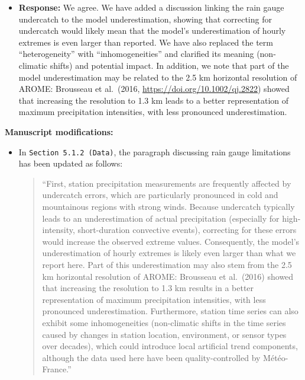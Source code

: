 \documentclass[
  letterpaper,
  DIV=11,
  numbers=noendperiod]{scrartcl}
\providecommand{\tightlist}{%
  \setlength{\itemsep}{0pt}\setlength{\parskip}{0pt}}\usepackage{longtable,booktabs,array}
\begin{document}
\begin{itemize}
\tightlist
\item
  \textbf{Response:} We agree. We have added a discussion linking the
  rain gauge undercatch to the model underestimation, showing that
  correcting for undercatch would likely mean that the model's
  underestimation of hourly extremes is even larger than reported. We
  have also replaced the term ``heterogeneity'' with ``inhomogeneities''
  and clarified its meaning (non-climatic shifts) and potential impact.
  In addition, we note that part of the model underestimation may be
  related to the 2.5 km horizontal resolution of AROME: Brousseau et
  al.~(2016, \url{https://doi.org/10.1002/qj.2822}) showed that
  increasing the resolution to 1.3 km leads to a better representation
  of maximum precipitation intensities, with less pronounced
  underestimation.
\end{itemize}

\textbf{Manuscript modifications:}

\begin{itemize}
\item
  In \texttt{Section\ 5.1.2\ (Data)}, the paragraph discussing rain
  gauge limitations has been updated as follows:

  \begin{quote}
  ``First, station precipitation measurements are frequently affected by
  undercatch errors, which are particularly pronounced in cold and
  mountainous regions with strong winds. Because undercatch typically
  leads to an underestimation of actual precipitation (especially for
  high-intensity, short-duration convective events), correcting for
  these errors would increase the observed extreme values. Consequently,
  the model's underestimation of hourly extremes is likely even larger
  than what we report here. Part of this underestimation may also stem
  from the 2.5 km horizontal resolution of AROME: Brousseau et
  al.~(2016) showed that increasing the resolution to 1.3 km results in
  a better representation of maximum precipitation intensities, with
  less pronounced underestimation. Furthermore, station time series can
  also exhibit some inhomogeneities (non-climatic shifts in the time
  series caused by changes in station location, environment, or sensor
  types over decades), which could introduce local artificial trend
  components, although the data used here have been quality-controlled
  by Météo-France.''
  \end{quote}
\end{itemize}
\end{document}
